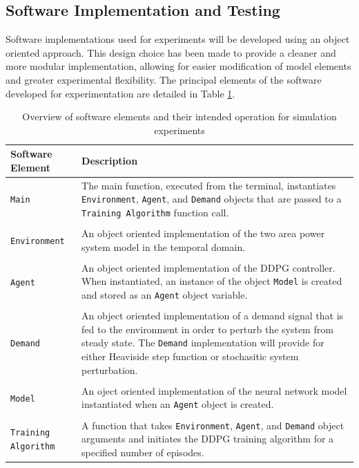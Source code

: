 \subsection{Software Implementation and Testing}
Software implementations used for experiments will be developed using an object oriented approach. This design choice has been made to provide a cleaner and more modular implementation, allowing for easier modification of model elements and greater experimental flexibility. The principal elements of the software developed for experimentation are detailed in Table \ref{tab:software_elements}.
\begin{table}[h]
	\centering
	\caption{Overview of software elements and their intended operation for simulation experiments}
	\begin{tabular}{lp{10cm}}
		\toprule
		\textbf{Software Element} & \textbf{Description} \\
		\midrule
		\texttt{Main} & The main function, executed from the terminal, instantiates \texttt{Environment}, \texttt{Agent}, and \texttt{Demand} objects that are passed to a \texttt{Training Algorithm} function call.\\
		 & \\
		\texttt{Environment} & An object oriented implementation of the two area power system model in the temporal domain.\\
		 & \\
		\texttt{Agent} & An object oriented implementation of the DDPG controller. When instantiated, an instance of the object \texttt{Model} is created and stored as an \texttt{Agent} object variable. \\
		 & \\
		\texttt{Demand} & An object oriented implementation of a demand signal that is fed to the environment in order to perturb the system from steady state. The \texttt{Demand} implementation will provide for either Heaviside step function or stochasitic system perturbation.\\
		 & \\
		\texttt{Model} & An oject oriented implementation of the neural network model instantiated when an \texttt{Agent} object is created.\\
		 & \\
		\texttt{Training Algorithm} & A function that takes \texttt{Environment}, \texttt{Agent}, and \texttt{Demand} object arguments and initiates the DDPG training algorithm for a specified number of episodes.\\
		\bottomrule
	\end{tabular}
	\label{tab:software_elements}
\end{table}


